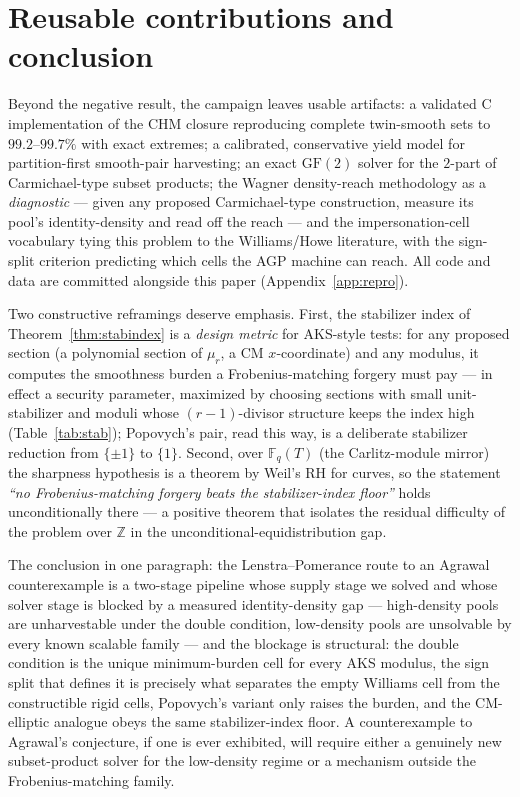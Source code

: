 \documentclass[11pt]{article}
\theoremstyle{remark}
\newcommand{\Z}{\mathbb{Z}}
\newcommand{\F}{\mathbb{F}}
\begin{document}
\section{Reusable contributions and conclusion}\label{sec:conclusion}

Beyond the negative result, the campaign leaves usable artifacts: a
validated C implementation of the CHM closure reproducing complete
twin-smooth sets to $99.2$--$99.7\%$ with exact extremes; a calibrated,
conservative yield model for partition-first smooth-pair harvesting; an
exact $\mathrm{GF}(2)$ solver for the $2$-part of Carmichael-type subset
products; the Wagner density-reach methodology as a \emph{diagnostic} ---
given any proposed Carmichael-type construction, measure its pool's
identity-density and read off the reach --- and the impersonation-cell
vocabulary tying this problem to the Williams/Howe literature, with the
sign-split criterion predicting which cells the AGP machine can reach.
All code and data are committed alongside this paper
(Appendix~\ref{app:repro}).

Two constructive reframings deserve emphasis. First, the stabilizer index
of Theorem~\ref{thm:stabindex} is a \emph{design metric} for AKS-style
tests: for any proposed section (a polynomial section of $\mu_r$, a CM
$x$-coordinate) and any modulus, it computes the smoothness burden a
Frobenius-matching forgery must pay --- in effect a security parameter,
maximized by choosing sections with small unit-stabilizer and moduli whose
$(r-1)$-divisor structure keeps the index high (Table~\ref{tab:stab});
Popovych's pair, read this way, is a deliberate stabilizer reduction from
$\{\pm1\}$ to $\{1\}$. Second, over $\F_q(T)$ (the Carlitz-module mirror)
the sharpness hypothesis is a theorem by Weil's RH for curves, so the
statement \emph{``no Frobenius-matching forgery beats the
stabilizer-index floor''} holds unconditionally there --- a positive
theorem that isolates the residual difficulty of the problem over $\Z$ in
the unconditional-equidistribution gap.

The conclusion in one paragraph: the Lenstra--Pomerance route to an
Agrawal counterexample is a two-stage pipeline whose supply stage we
solved and whose solver stage is blocked by a measured identity-density
gap --- high-density pools are unharvestable under the double condition,
low-density pools are unsolvable by every known scalable family --- and
the blockage is structural: the double condition is the unique
minimum-burden cell for every AKS modulus, the sign split that defines it
is precisely what separates the empty Williams cell from the constructible
rigid cells, Popovych's variant only raises the burden, and the
CM-elliptic analogue obeys the same stabilizer-index floor. A
counterexample to Agrawal's conjecture, if one is ever exhibited, will
require either a genuinely new subset-product solver for the low-density
regime or a mechanism outside the Frobenius-matching family.
\end{document}
